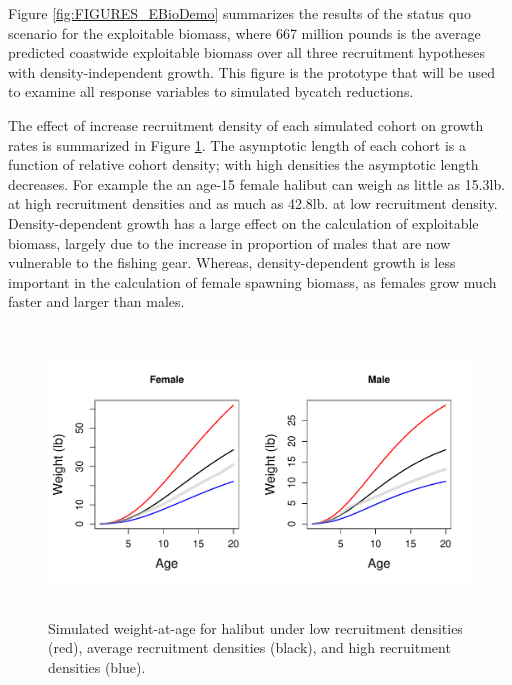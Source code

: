 Figure \ref{fig:FIGURES_EBioDemo} summarizes the results of the status quo scenario for the exploitable biomass, where 667 million pounds is the average predicted coastwide exploitable biomass over all three recruitment hypotheses with density-independent growth. This figure is the prototype that will be used to examine all response variables to simulated bycatch reductions.

The effect of increase recruitment density of each simulated cohort on growth rates is summarized in Figure \ref{fig:FIGURES_fig:growth}.  The asymptotic length of each cohort is a function of relative cohort density; with high densities the asymptotic length decreases.   For example the an age-15 female halibut can weigh as little as 15.3lb. at high recruitment densities and as much as 42.8lb. at low recruitment density.  Density-dependent growth has a large effect on the calculation of exploitable biomass, largely due to the increase in proportion of males that are now vulnerable to the fishing gear.  Whereas, density-dependent growth is less important in the calculation of female spawning biomass, as females grow much faster and larger than males.

\begin{figure}[htbp]
	\centering
		\includegraphics[height=3in]{../FIGURES/fig:growth.pdf}
	\caption{Simulated weight-at-age for halibut under low recruitment densities (red), average recruitment densities (black), and high recruitment densities (blue).}
	\label{fig:FIGURES_fig:growth}
\end{figure}



